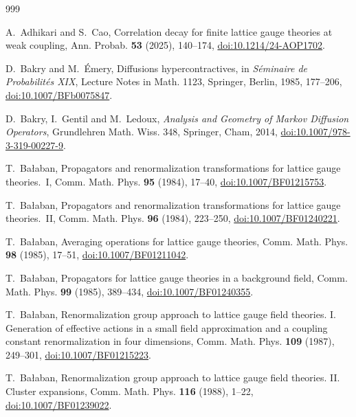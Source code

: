\documentclass[aps,prd,twocolumn,superscriptaddress,nofootinbib,longbibliography,floatfix,amsmath,amssymb,10pt]{revtex4-2}
\theoremstyle{definition}
\theoremstyle{remark}
\begin{document}
\def\bibsection{\par\vskip10pt\noindent\hfil\rule{0.5\columnwidth}{0.4pt}\hfil\par\vskip8pt}
\begin{thebibliography}{999}\raggedright\advance\leftskip{}

A.~Adhikari and S.~Cao, Correlation decay for finite lattice gauge theories
at weak coupling, Ann. Probab. \textbf{53} (2025), 140--174,
\href{https://doi.org/10.1214/24-AOP1702}{doi:10.1214/24-AOP1702}.

D.~Bakry and M.~\'Emery, Diffusions hypercontractives, in \emph{S\'eminaire
de Probabilit\'es XIX}, Lecture Notes in Math. 1123, Springer, Berlin, 1985,
177--206, \href{https://doi.org/10.1007/BFb0075847}{doi:10.1007/BFb0075847}.

D.~Bakry, I.~Gentil and M.~Ledoux, \emph{Analysis and Geometry of Markov
Diffusion Operators}, Grundlehren Math. Wiss. 348, Springer, Cham, 2014,
\href{https://doi.org/10.1007/978-3-319-00227-9}{doi:10.1007/978-3-319-00227-9}.

T.~Ba{\l}aban, Propagators and renormalization transformations for lattice
gauge theories.~I, Comm. Math. Phys. \textbf{95} (1984), 17--40,
\href{https://doi.org/10.1007/BF01215753}{doi:10.1007/BF01215753}.

T.~Ba{\l}aban, Propagators and renormalization transformations for lattice
gauge theories.~II, Comm. Math. Phys. \textbf{96} (1984), 223--250,
\href{https://doi.org/10.1007/BF01240221}{doi:10.1007/BF01240221}.

T.~Ba{\l}aban, Averaging operations for lattice gauge theories, Comm. Math.
Phys. \textbf{98} (1985), 17--51,
\href{https://doi.org/10.1007/BF01211042}{doi:10.1007/BF01211042}.

T.~Ba{\l}aban, Propagators for lattice gauge theories in a background field,
Comm. Math. Phys. \textbf{99} (1985), 389--434,
\href{https://doi.org/10.1007/BF01240355}{doi:10.1007/BF01240355}.

T.~Ba{\l}aban, Renormalization group approach to lattice gauge field theories.
I. Generation of effective actions in a small field approximation and a
coupling constant renormalization in four dimensions, Comm. Math. Phys.
\textbf{109} (1987), 249--301,
\href{https://doi.org/10.1007/BF01215223}{doi:10.1007/BF01215223}.

T.~Ba{\l}aban, Renormalization group approach to lattice gauge field theories.
II. Cluster expansions, Comm. Math. Phys. \textbf{116} (1988), 1--22,
\href{https://doi.org/10.1007/BF01239022}{doi:10.1007/BF01239022}.


\end{thebibliography}
\end{document}
